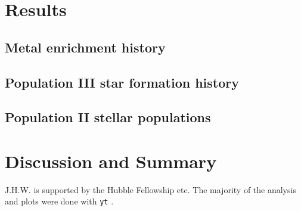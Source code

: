 \documentclass[apjl]{emulateapj}
\begin{document}
\section{Results}
\label{sec:results}

\subsection{Metal enrichment history}

\subsection{Population III star formation history}

\subsection{Population II stellar populations}

\section{Discussion and Summary}

\acknowledgments

J.H.W. is supported by the Hubble Fellowship etc.  The majority of the
analysis and plots were done with \texttt{yt} \citep{yt}.

%

\end{document}
